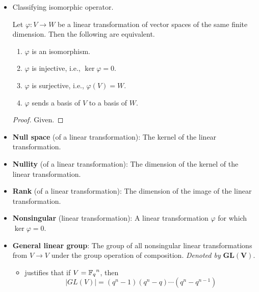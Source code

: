 \documentclass[../notes.tex]{subfiles}
\begin{document}
\begin{itemize}
    \item Classifying isomorphic operator.
    \begin{corollary}\label{cly:11.9}
        Let $\varphi:V\to W$ be a linear transformation of vector spaces of the same finite dimension. Then the following are equivalent.
        \begin{enumerate}
            \item $\varphi$ is an isomorphism.
            \item $\varphi$ is injective, i.e., $\ker\varphi=0$.
            \item $\varphi$ is surjective, i.e., $\varphi(V)=W$.
            \item $\varphi$ sends a basis of $V$ to a basis of $W$.
        \end{enumerate}
        \begin{proof}
            Given.
        \end{proof}
    \end{corollary}
    \item \textbf{Null space} (of a linear transformation): The kernel of the linear transformation.
    \item \textbf{Nullity} (of a linear transformation): The dimension of the kernel of the linear transformation.
    \item \textbf{Rank} (of a linear transformation): The dimension of the image of the linear transformation.
    \item \textbf{Nonsingular} (linear transformation): A linear transformation $\varphi$ for which $\ker\varphi=0$.
    \item \textbf{General linear group}: The group of all nonsingular linear transformations from $V\to V$ under the group operation of composition. \emph{Denoted by} $\bm{GL(V)}$.
    \begin{itemize}
        \item \textcite{bib:DummitFoote} justifies that if $V={\mathbb{F}_q}^n$, then
        \begin{equation*}
            |GL(V)| = (q^n-1)(q^n-q)\cdots(q^n-q^{n-1})
        \end{equation*}
    \end{itemize}
\end{itemize}
\end{document}
